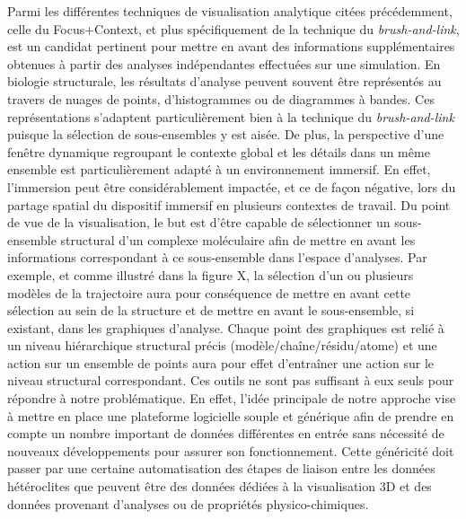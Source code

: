 Parmi les différentes techniques de visualisation analytique citées précédemment, celle du Focus+Context, et plus spécifiquement de la technique du \textit{brush-and-link}, est un candidat pertinent pour mettre en avant des informations supplémentaires obtenues à partir des analyses indépendantes effectuées sur une simulation. En biologie structurale, les résultats d'analyse peuvent souvent être représentés au travers de nuages de points, d'histogrammes ou de diagrammes à bandes. Ces représentations s'adaptent particulièrement bien à la technique du \textit{brush-and-link} puisque la sélection de sous-ensembles y est aisée. De plus, la perspective d'une fenêtre dynamique regroupant le contexte global et les détails dans un même ensemble est particulièrement adapté à un environnement immersif. En effet, l'immersion peut être considérablement impactée, et ce de façon négative, lors du partage spatial du dispositif immersif en plusieurs contextes de travail.
Du point de vue de la visualisation, le but est d'être capable de sélectionner un sous-ensemble structural d'un complexe moléculaire afin de mettre en avant les informations correspondant à ce sous-ensemble dans l'espace d'analyses. Par exemple, et comme illustré dans la figure X, la sélection d'un ou plusieurs modèles de la trajectoire aura pour conséquence de mettre en avant cette sélection au sein de la structure et de mettre en avant le sous-ensemble, si existant, dans les graphiques d'analyse. Chaque point des graphiques est relié à un niveau hiérarchique structural précis (modèle/chaîne/résidu/atome) et une action sur un ensemble de points aura pour effet d’entraîner une action sur le niveau structural correspondant. 
Ces outils ne sont pas suffisant à eux seuls pour répondre à notre problématique. En effet, l'idée principale de notre approche vise à mettre en place une plateforme logicielle souple et générique afin de prendre en compte un nombre important de données différentes en entrée sans nécessité de nouveaux développements pour assurer son fonctionnement. Cette généricité doit passer par une certaine automatisation des étapes de liaison entre les données hétéroclites que peuvent être des données dédiées à la visualisation 3D et des données provenant d'analyses ou de propriétés physico-chimiques.


